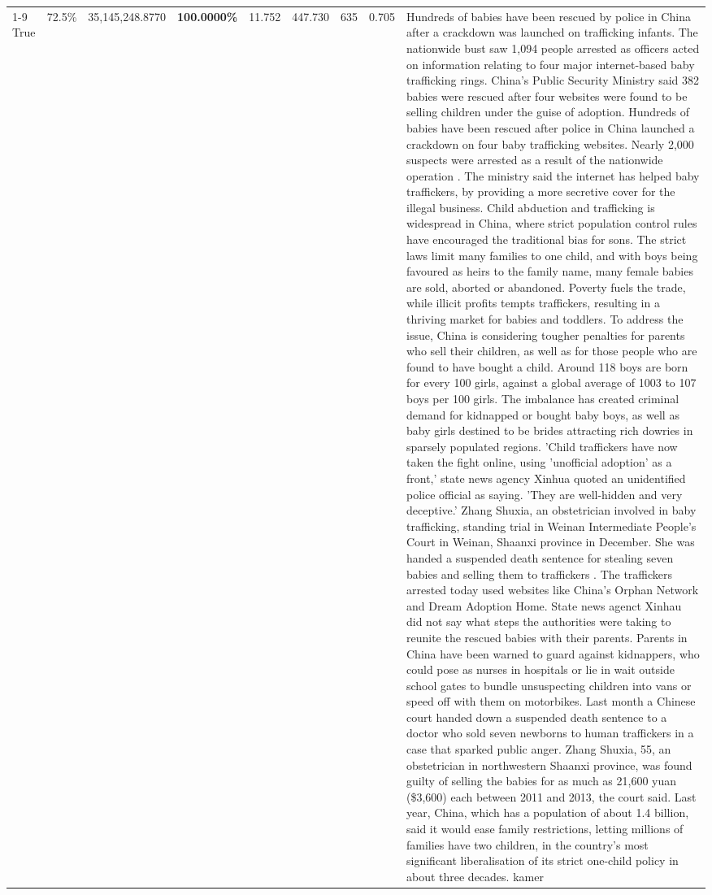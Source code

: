 \begin{table}[H]
\begin{tabular}{lllrlllll}
\cline{1-9}
True & 72.5\% & 35,145,248.8770 & \bfseries \color{red} 100.0000\% & 11.752 & 447.730 & 635 & 0.705 & Hundreds of babies have been rescued by police in China after a crackdown was launched on trafficking infants. The nationwide bust saw 1,094 people arrested as officers acted on information relating to four major internet-based baby trafficking rings. China's Public Security Ministry said 382 babies were rescued after four websites were found to be selling children under the guise of adoption. Hundreds of babies have been rescued after police in China launched a crackdown on four baby trafficking websites. Nearly 2,000 suspects were arrested as a result of the nationwide operation . The ministry said the internet has helped baby traffickers, by providing a more secretive cover for the illegal business. Child abduction and trafficking is widespread in China, where strict population control rules have encouraged the traditional bias for sons. The strict laws limit many families to one child, and with boys being favoured as heirs to the family name, many female babies are sold, aborted or abandoned. Poverty fuels the trade, while illicit profits tempts traffickers, resulting in a thriving market for babies and toddlers. To address the issue, China is considering tougher penalties for parents who sell their children, as well as for those people who are found to have bought a child. Around 118 boys are born for every 100 girls, against a global average of 1003 to 107 boys per 100 girls. The imbalance has created criminal demand for kidnapped or bought baby boys, as well as baby girls destined to be brides attracting rich dowries in sparsely populated regions. 'Child traffickers have now taken the fight online, using 'unofficial adoption' as a front,' state news agency Xinhua quoted an unidentified police official as saying. 'They are well-hidden and very deceptive.' Zhang Shuxia, an obstetrician involved in baby trafficking, standing trial in Weinan Intermediate People's Court in Weinan, Shaanxi province in December. She was handed a suspended death sentence for stealing seven babies and selling them to traffickers . The traffickers arrested today used websites like China's Orphan Network and Dream Adoption Home. State news agenct Xinhau did not say what steps the authorities were taking to reunite the rescued babies with their parents. Parents in China have been warned to guard against kidnappers, who could pose as nurses in hospitals or lie in wait outside school gates to bundle unsuspecting children into vans or speed off with them on motorbikes. Last month a Chinese court handed down a suspended death sentence to a doctor who sold seven newborns to human traffickers in a case that sparked public anger. Zhang Shuxia, 55, an obstetrician in northwestern Shaanxi province, was found guilty of selling the babies for as much as 21,600 yuan (\$3,600) each between 2011 and 2013, the court said. Last year, China, which has a population of about 1.4 billion, said it would ease family restrictions, letting millions of families have two children, in the country's most significant liberalisation of its strict one-child policy in about three decades. kamer \\

\end{tabular}
\end{table}
